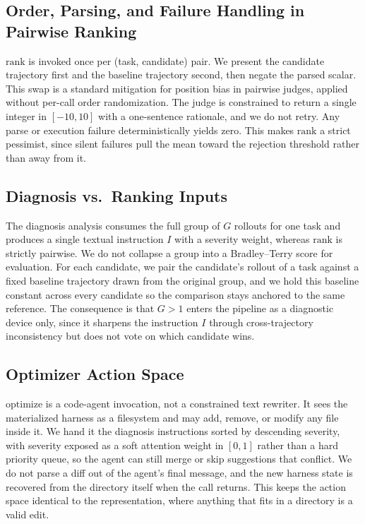 \subsection{Order, Parsing, and Failure Handling in Pairwise Ranking}

 $\mathrm{rank}$ is invoked once per (task, candidate) pair. We present the candidate trajectory first and the baseline trajectory second, then negate the parsed scalar. This swap is a standard mitigation for position bias in pairwise judges, applied without per-call order randomization. The judge is constrained to return a single integer in $[-10, 10]$ with a one-sentence rationale, and we do not retry. Any parse or execution failure deterministically yields zero. This makes $\mathrm{rank}$ a strict pessimist, since silent failures pull the mean toward the rejection threshold rather than away from it.

\subsection{Diagnosis vs.\ Ranking Inputs}

The diagnosis analysis consumes the full group of $G$ rollouts for one task and produces a single textual instruction $I$ with a severity weight, whereas $\mathrm{rank}$ is strictly pairwise. We do not collapse a group into a Bradley--Terry score for evaluation. For each candidate, we pair the candidate's rollout of a task against a fixed baseline trajectory drawn from the original group, and we hold this baseline constant across every candidate so the comparison stays anchored to the same reference. The consequence is that $G > 1$ enters the pipeline as a diagnostic device only, since it sharpens the instruction $I$ through cross-trajectory inconsistency but does not vote on which candidate wins.

\subsection{Optimizer Action Space}

$\mathrm{optimize}$ is a code-agent invocation, not a constrained text rewriter. It sees the materialized harness as a filesystem and may add, remove, or modify any file inside it. We hand it the diagnosis instructions sorted by descending severity, with severity exposed as a soft attention weight in $[0, 1]$ rather than a hard priority queue, so the agent can still merge or skip suggestions that conflict. We do not parse a diff out of the agent's final message, and the new harness state is recovered from the directory itself when the call returns. This keeps the action space identical to the representation, where anything that fits in a directory is a valid edit.

